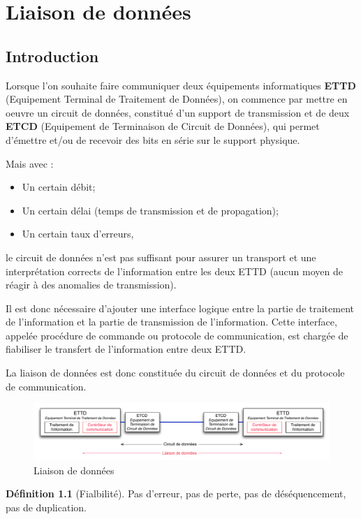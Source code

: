 \documentclass[11pt,english,french]{scrreprt}
\theoremstyle{remark}
\theoremstyle{definition}
\newtheorem*{def*}{Définition}
\begin{document}
\chapter{Liaison de données} %

\section{Introduction} %

Lorsque l'on souhaite faire communiquer deux équipements informatiques \textbf{ETTD} (Equipement Terminal de Traitement de Données), on commence par mettre en oeuvre un circuit de données, constitué d'un support de transmission et de deux \textbf{ETCD} (Equipement de Terminaison de Circuit de Données), qui permet d'émettre et/ou de recevoir des bits en série sur le support physique.

Mais avec :\begin{itemize}
	\item Un certain débit;
	\item Un certain délai (temps de transmission et de propagation);
	\item Un certain taux d'erreurs,
\end{itemize}
le circuit de données n'est pas suffisant pour assurer un transport et une interprétation corrects de l'information entre les deux ETTD (aucun moyen de réagir à des anomalies de transmission). 

Il est donc nécessaire d'ajouter une interface logique entre la partie de traitement de l'information et la partie de transmission de l'information. Cette interface, appelée procédure de commande ou protocole de communication, est chargée de fiabiliser le transfert de l'information entre deux ETTD.

La liaison de données est donc constituée du circuit de données et du protocole de communication.

\begin{figure}[h!]
	\center
	\includegraphics[scale=.5]{graphes/ETTD}
	\caption{Liaison de données}
\end{figure}

\begin{def*}[Fialbilité]
	Pas d'erreur, pas de perte, pas de déséquencement, pas de duplication.
\end{def*}
\end{document}
